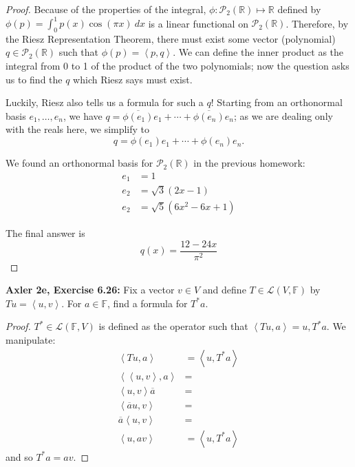 \documentclass{article}
\newcommand{\R}{\mathbb{R}}
\newcommand{\F}{\mathbb{F}}
\newcommand{\ol}[1]{\overline{#1}}
\newcommand{\iprod}[2]{\left\langle #1, #2 \right\rangle}
\begin{document}
\begin{proof}
    Because of the properties of the integral, $\phi : \mathcal{P}_2(\R) \mapsto \R$ defined by $\phi(p) = \int_0^1 p(x) \cos(\pi x) \: dx$ is a linear functional on $\mathcal{P}_2(\R)$. Therefore, by the Riesz Representation Theorem, there must exist some vector (polynomial) $q \in \mathcal{P}_2(\R)$ such that $\phi(p) = \iprod{p}{q}$. We can define the inner product as the integral from 0 to 1 of the product of the two polynomials; now the question asks us to find the $q$ which Riesz says must exist. 

    Luckily, Riesz also tells us a formula for such a $q$! Starting from an orthonormal basis $e_1, \dots, e_n$, we have $q = \ol{\phi(e_1)} e_1 + \cdots + \ol{\phi(e_n)}e_n$; as we are dealing only with the reals here, we simplify to
    $$q = \phi(e_1)e_1 + \cdots + \phi(e_n) e_n.$$

    We found an orthonormal basis for $\mathcal{P}_2(\R)$ in the previous homework:
    \begin{align*}
        e_1 &= 1 \\
        e_2 &= \sqrt{3}(2x - 1) \\
        e_2 &= \sqrt{5}(6x^2 - 6x + 1)
    \end{align*}

    The final answer is
    $$q(x) = \frac{12 - 24x}{\pi^2}$$
\end{proof}


\newpage %


\textbf{Axler 2e, Exercise 6.26: } %
Fix a vector $v \in V$ and define $T \in \mathcal{L}(V, \F)$ by $Tu = \iprod{u}{v}$. For $a \in \F$, find a formula for $T^* a$.

\begin{proof}
    $T^* \in \mathcal{L}(\F, V)$ is defined as the operator such that $\iprod{Tu}{a} = {u, T^* a}$. We manipulate:
    \begin{align*}
        \iprod{Tu}{a} &= \iprod{u}{T^* a} \\
        \iprod{\iprod{u}{v}}{a} &= \\
        \iprod{u}{v}\ol{a} &= \\
        \iprod{\ol{a}u}{v} &= \\
        \ol{a} \iprod{u}{v} &= \\
        \iprod{u}{av} &= \iprod{u}{T^* a}
    \end{align*}
    and so $T^* a = av$.    
\end{proof}
\end{document}
